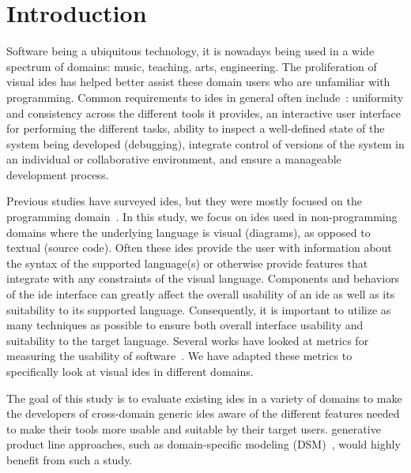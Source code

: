 \section{Introduction} \label{sec:introduction}

Software being a ubiquitous technology, it is nowadays being used in a wide spectrum of domains: music, teaching, arts, engineering.
The proliferation of visual \acfp{ide} has helped better assist these domain users who are unfamiliar with programming.
Common requirements to \acp{ide} in general often include~\cite{habermann1986}: uniformity and consistency across the different tools it provides, an interactive user interface for performing the different tasks, ability to inspect a well-defined state of the system being developed (\eg debugging), integrate control of versions of the system in an individual or collaborative environment, and ensure a manageable development process.

Previous studies have surveyed \acp{ide}, but they were mostly focused on the
programming domain~\cite{hils1992, fischer1994, habermann1986}.
In this study, we focus on \acp{ide} used in non-programming domains where the underlying language is visual (\eg diagrams), as opposed to textual (\eg source code).
Often these \acp{ide} provide the user with information about the syntax of the supported language(s) or otherwise provide features that integrate with any constraints of the visual language.
Components and behaviors of the \ac{ide} interface can greatly affect the overall usability of an \ac{ide} as well as its suitability to its supported language.
Consequently, it is important to utilize as many techniques as possible to ensure both overall interface usability and suitability to the target language.
Several works have looked at metrics for measuring the usability of
software~\cite{constantine1996,Green1996}.
We have adapted these metrics to specifically look at visual \acp{ide} in different domains.

The goal of this study is to evaluate existing \acp{ide} in a variety of domains to make the developers of cross-domain generic \acp{ide} aware of the different features needed to make their tools more usable and suitable by their target users.
generative product line approaches, such as domain-specific modeling (DSM)~\cite{Kelly2008}, would highly benefit from such a study.

